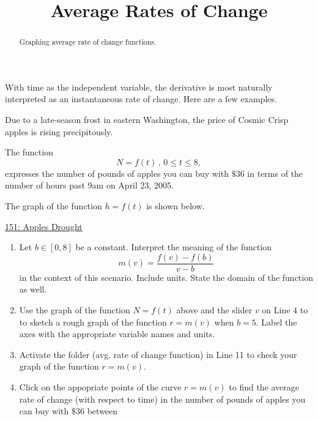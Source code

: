 \documentclass{ximera}
\title{Average Rates of Change}
\begin{document}
\begin{abstract}
Graphing average rate of change functions.
\end{abstract}
\maketitle


With time as the independent variable, the derivative is most naturally interpreted as an instantaneous rate of change. Here are a few examples. %

\begin{question}  \label{Q4ghg5df5yhhfg4tr4}
Due to a late-season frost in eastern Washington, the price of Cosmic Crisp apples is rising precipitously.

The function
\[
      N = f(t)  \, , \, 0\leq t \leq 8 ,                     %
\]
expresses the number of pounds of apples you can buy with $\$36$ in terms of the number of hours past 9am on April 23, 2005. 

The graph of the function $h=f(t)$ is shown below.

\begin{onlineOnly}
    \begin{center}
\end{center}
\end{onlineOnly}

\href{https://www.desmos.com/calculator/njanpkrqex}{151: Apples Drought}

\begin{enumerate}

\item Let $b\in [0,8]$ be a constant. Interpret the meaning of the function
\[
   m(v) =  \frac{f(v)-f(b)}{v-b}
\]
in the context of this scenario. Include units. State the domain of the function as well.

\item Use the graph of the function $N=f(t)$ above and the slider $v$ on Line 4 to to sketch a rough graph of the function $r=m(v)$ when $b=5$. Label the axes with the appropriate variable names and units.

\item Activate the folder (avg. rate of change function) in Line 11 to check your graph of the function $r=m(v)$. 

\item Click on the appopriate points of the curve $r=m(v)$ to find the average rate of change (with respect to time) in the number of pounds of apples you can buy with $\$36$ between 


\end{enumerate}
\end{question}
\end{document}
